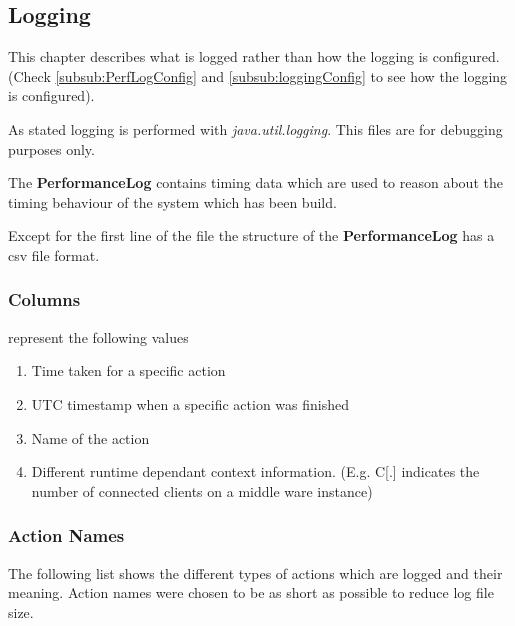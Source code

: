 \documentclass[a4paper]{article}
\begin{document}
\subsection{Logging}
This chapter describes what is logged rather than how the logging is configured. (Check \ref{subsub:PerfLogConfig} and \ref{subsub:loggingConfig} to see how the logging is configured).

As stated logging is performed with \textit{java.util.logging}. This files are for debugging purposes only.

The \textbf{PerformanceLog} contains timing data which are used to reason about the timing behaviour of the system which has been build.

Except for the first line of the file the structure of the \textbf{PerformanceLog} has a csv file format.


\subsubsection{Columns} represent the following values
\begin{enumerate}
\item Time taken for a specific action
\item UTC timestamp when a specific action was finished
\item Name of the action
\item Different runtime dependant context information. (E.g. C[.] indicates the number of connected clients on a middle ware instance)
\end{enumerate}

\subsubsection{Action Names}
\label{subsub:PerfLogger-ActionNames}
The following list shows the different types of actions which are logged and their meaning. Action names were chosen to be as short as possible to reduce log file size.
\end{document}
